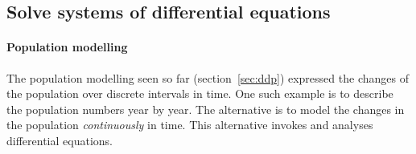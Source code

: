 \subsection{Solve systems of differential equations}
\label{sec:ssde}

\paragraph{Population modelling}
The population modelling seen so far (section~\ref{sec:ddp}) expressed the changes of the population over discrete intervals in time.
One such example is to describe the population numbers year by year.
The alternative is to model the changes in the population \emph{continuously} in time.
This alternative invokes and analyses differential equations.

